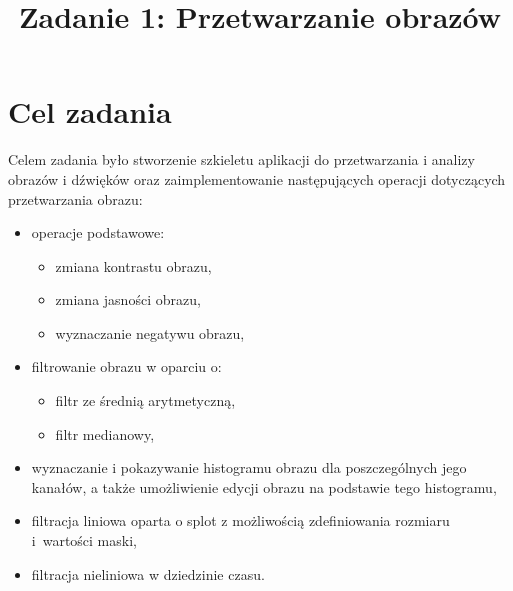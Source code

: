 \documentclass{classrep}
\author{%
  \studentinfo{Michał Janiszewski}{169485} \and
  \studentinfo{Michał Kawski}{169487}
}
\title{Zadanie 1: Przetwarzanie obrazów}
\begin{document}
\maketitle

\section{Cel zadania}
Celem zadania było stworzenie szkieletu aplikacji do przetwarzania i analizy obrazów i dźwięków oraz zaimplementowanie następujących operacji dotyczących przetwarzania obrazu:
\begin{itemize}
 \item operacje podstawowe:
  \begin{itemize}
   \item zmiana kontrastu obrazu,
   \item zmiana jasności obrazu,
   \item wyznaczanie negatywu obrazu,
  \end{itemize}
 \item filtrowanie obrazu w oparciu o:
  \begin{itemize}
   \item filtr ze średnią arytmetyczną,
   \item filtr medianowy,
  \end{itemize}
 \item wyznaczanie i pokazywanie histogramu obrazu dla poszczególnych jego kanałów, a także umożliwienie edycji obrazu na podstawie tego histogramu,
 \item filtracja liniowa oparta o splot z możliwością zdefiniowania rozmiaru i~wartości maski,
 \item filtracja nieliniowa w dziedzinie czasu.
\end{itemize}
\end{document}

